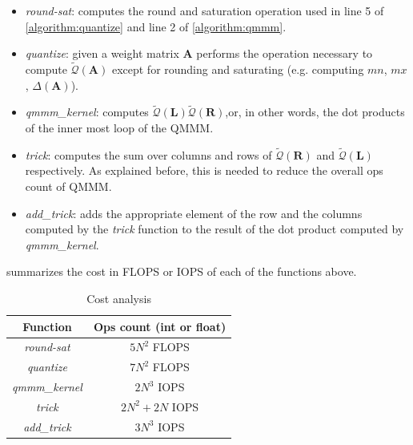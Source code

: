 \begin{itemize}
\item \emph{round-sat}: computes the round and saturation operation used in line 5 of \cref{algorithm:quantize} and line 2 of \cref{algorithm:qmmm}.
\item \emph{quantize}: given a weight matrix $\mathbf{A}$ performs the operation necessary to compute  $\tilde{\mathcal{Q}}(\mathbf{A}) $ except for rounding and saturating (e.g. computing $mn$, $mx$, $\Delta(\mathbf{A})$).
\item \emph{qmmm\_kernel}: computes $ \tilde{\mathcal{Q}}(\mathbf{L}) \tilde{\mathcal{Q}}(\mathbf{R})$,or, in other words, the dot products of the inner most loop of the QMMM.
\item \emph{trick}: computes the sum over columns and rows of $\tilde{\mathcal{Q}}(\mathbf{R})$ and $\tilde{\mathcal{Q}}(\mathbf{L})$ respectively. As explained before, this is needed to reduce the overall ops count of QMMM. 
\item \emph{add\_trick}: adds the appropriate element of the row and the columns computed by the \emph{trick} function to the result of the dot product computed by \emph{qmmm\_kernel}.
\end{itemize}
 summarizes the cost in FLOPS or IOPS of each of the functions above.

\begin{table}
\centering
\begin{tabular}{ c|c } 
 
 Function & Ops count (int or float) \\
 \hline 
 \emph{round-sat} & $5N^2$ FLOPS \\
\emph{quantize} & $7N^2$ FLOPS \\
\emph{qmmm\_kernel} & $2N^3$ IOPS \\
\emph{trick} & $2N^2 + 2N$ IOPS \\
\emph{add\_trick} & $3N^3$ IOPS \\
 \end{tabular}
  \caption{Cost analysis}
\label{tab:cost} 
\end{table}





